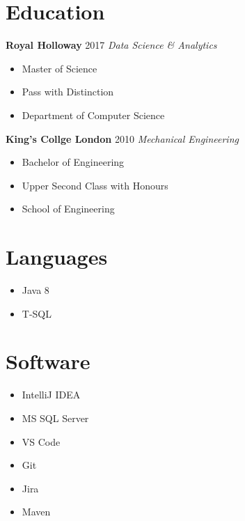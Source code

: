 \documentclass[letterpaper,11pt]{article}
\begin{document}
\begin{minipage}[t]{0.3\linewidth}
	\section{Education}
	\textbf{Royal Holloway} \hfill 2017
	\newline
	\textit{Data Science \& Analytics}
	\begin{itemize}[leftmargin=*, itemsep=0.1em]
		\item	Master of Science
		\item	Pass with Distinction
		\item 	Department of Computer Science
	\end{itemize}
	\vspace{0.15cm}
	\textbf{King's Collge London} \hfill 2010
	\newline
	\textit{Mechanical Engineering}
	\begin{itemize}[leftmargin=*, itemsep=0.1em]
		\item Bachelor of Engineering
		\item Upper Second Class with Honours
		\item School of Engineering
	\end{itemize}
\end{minipage}
\hspace{0.2cm}
\begin{minipage}[t]{0.15\linewidth}
	\section{Languages}
	\begin{itemize}[leftmargin=*]
		\item Java 8
		\item T-SQL
	\end{itemize}
	\section{Software}
	\begin{itemize}[leftmargin=*]
		\item IntelliJ IDEA
		\item MS SQL Server
		\item VS Code
		\item Git
		\item Jira
		\item Maven
	\end{itemize}
\end{minipage}
\end{document}
